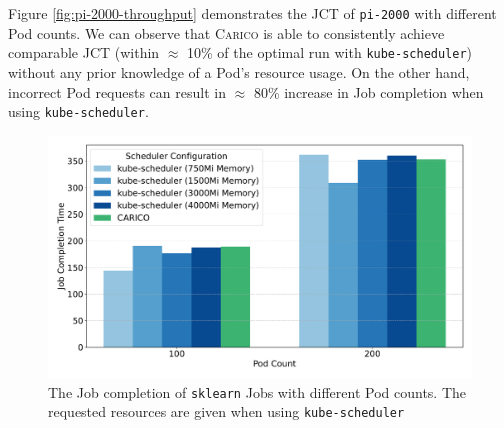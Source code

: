 Figure \ref{fig:pi-2000-throughput} demonstrates the JCT of
\texttt{pi-2000} with different Pod counts. We can observe that \textsc{Carico}
is able to consistently achieve comparable JCT (within $\approx$
10\% of the optimal run with \texttt{kube-scheduler}) without any prior
knowledge of a Pod's resource usage. On the other hand, incorrect Pod requests
can result in $\approx$ 80\% increase in Job completion when using
\texttt{kube-scheduler}.


\begin{figure}[ht!]
    \centering
    \includegraphics[width=\textwidth]{images/ml-job-completion.pdf}
    \caption{The Job completion of \texttt{sklearn} Jobs with different Pod
    counts. The requested resources are given when using
    \texttt{kube-scheduler}}
    \label{fig:ml-throughput}
\end{figure}

